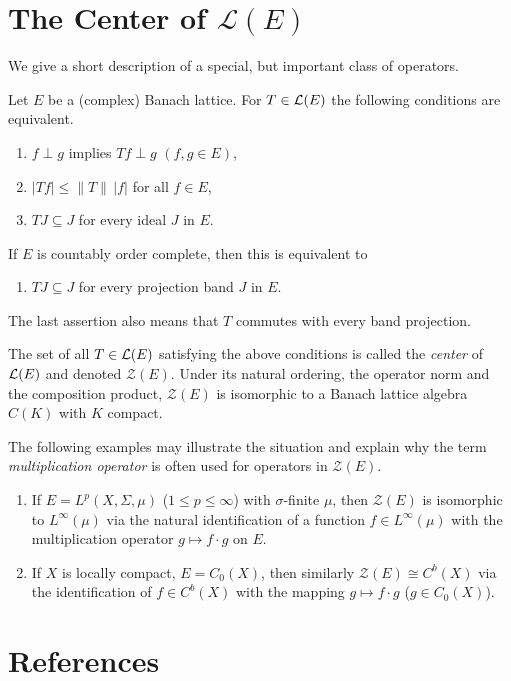 \section{The Center of 
\texorpdfstring{$\mathcal{L}(E)$}{L(E)}}\label{sec:c1-9}
%
We give a short description of a special, but important class of operators.
\begin{proposition*}
Let $ E $ be a (complex) Banach lattice.
For $ T \in \mathcal{L}(E) $ the following conditions are equivalent.
\begin{enumerate}[\upshape (a)]

    \item 
    $ f \perp g $ implies $ Tf \perp g $ \quad $(f, g \in E)$,
    
    \item 
    $ |Tf| \leq \|T\| \, |f| $ for all $ f \in E $,
    
    \item 
    $ TJ \subseteq J $ for every ideal $ J $ in $ E $.
    
\end{enumerate}
If\/ $ E $ is countably order complete, then this is equivalent to
\begin{enumerate}
    \item 
    $ TJ \subseteq J $ for every projection band $ J $ in $ E $.
\end{enumerate}
The last assertion also means that $ T $ commutes with every band projection.
\end{proposition*}
The set of all $ T \in \mathcal{L}(E) $ satisfying the above conditions is called the \emph{center} of\/ $ \mathcal{L}(E) $ and denoted 
$ \mathcal{Z}(E) $.
Under its natural ordering, the operator norm and the composition product, $ \mathcal{Z}(E) $ is isomorphic to a Banach lattice algebra $ C(K) $ with $ K $ compact.

The following examples may illustrate the situation and explain why the term \emph{multiplication operator} is often used for operators in $ \mathcal{Z}(E) $.
\begin{enumerate}[\upshape (i), wide, labelindent=.25em]
\item 
If\/ $ E = L^{p}(X,\Sigma,\mu) $ ($ 1 \leq p \leq \infty $) with $ \sigma $-finite $ \mu $, then $ \mathcal{Z}(E) $ is isomorphic to $ L^{\infty}(\mu) $ via the natural identification of a function $ f \in L^{\infty}(\mu) $ with the multiplication operator $ g \mapsto f\cdot g $ on $ E $. 

\item 
If\/ $ X $ is locally compact, $ E = C_{0}(X) $, then similarly $ \mathcal{Z}(E) \cong C^{b}(X) $ via the identification of\/ $ f \in C^{b}(X) $ with the mapping $ g \mapsto f\cdot g $ ($ g \in C_{0}(X) $).
\end{enumerate}
\section*{References}
{\RaggedRight
  \printbibliography[heading=none]
 }
